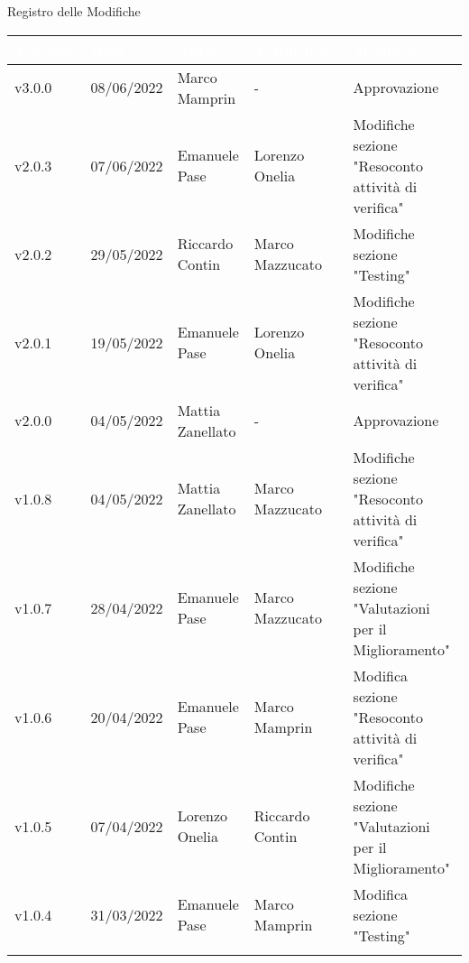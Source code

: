 \begin{center}
  \huge{Registro delle Modifiche}
\end{center}
\renewcommand\arraystretch{1,5}
{\centering
\begin{longtable}{|C{1.8cm}|C{2.1cm}|C{2cm}|C{2.4cm}|L{4.4cm}|}
  \hline
  \textcolor[HTML]{FFFFFF}{\textbf{Versione}} & \textcolor[HTML]{FFFFFF}{\textbf{Data}} & \textcolor[HTML]{FFFFFF}{\textbf{Autore}}  & \textcolor[HTML]{FFFFFF}{\textbf{Verificatore}} & \textcolor[HTML]{FFFFFF}{\textbf{Modifica}}    \\ \hline
  v3.0.0        & 08/06/2022  & Marco Mamprin  &   -     & Approvazione                 \\ \hline
  v2.0.3        & 07/06/2022    & Emanuele Pase    &  Lorenzo Onelia          & Modifiche sezione "Resoconto attività di verifica"            \\ \hline
  v2.0.2        & 29/05/2022  & Riccardo Contin  &   Marco Mazzucato   & Modifiche sezione "Testing"                 \\ \hline
  v2.0.1        & 19/05/2022    & Emanuele Pase    &      Lorenzo Onelia      & Modifiche sezione "Resoconto attività di verifica"            \\ \hline
  v2.0.0        & 04/05/2022  & Mattia Zanellato  &   -     & Approvazione                 \\ \hline
  v1.0.8        & 04/05/2022    & Mattia Zanellato    &  Marco Mazzucato    & Modifiche sezione "Resoconto attività di verifica"            \\ \hline
  v1.0.7        & 28/04/2022    & Emanuele Pase    &  Marco Mazzucato    & Modifiche sezione "Valutazioni per il Miglioramento"            \\ \hline
  v1.0.6        & 20/04/2022  & Emanuele Pase  &   Marco Mamprin     & Modifica sezione "Resoconto attività di verifica"                  \\ \hline
  v1.0.5        & 07/04/2022    & Lorenzo Onelia    & Riccardo Contin   & Modifiche sezione "Valutazioni per il Miglioramento"            \\ \hline
  v1.0.4        & 31/03/2022    & Emanuele Pase  &  Marco Mamprin   & Modifica sezione "Testing"                  \\ \hline

\end{longtable}}
